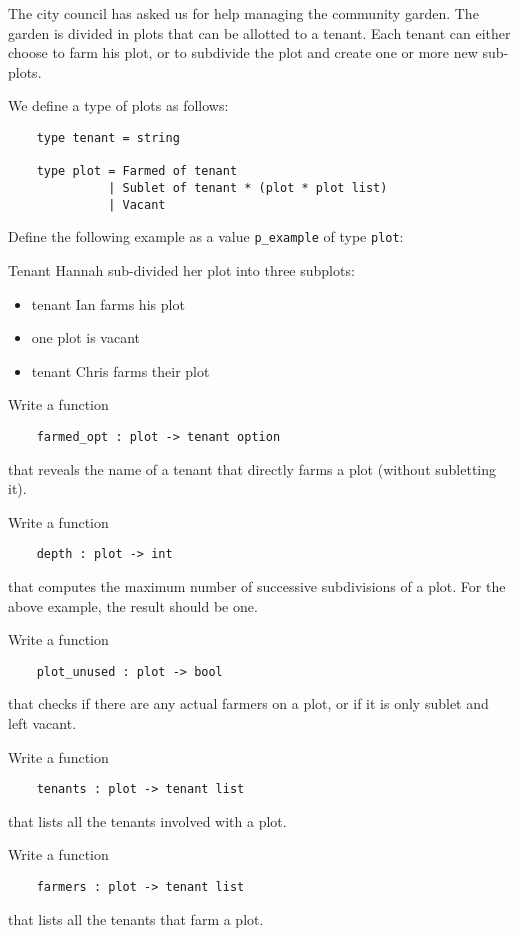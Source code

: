 \documentclass[arhiv]{../izpit}
\begin{document}
\naloga
The city council has asked us for help managing the community garden. The garden is divided in plots that can be allotted to a tenant. Each tenant can either choose to farm his plot, or to subdivide the plot and create one or more new sub-plots.

We define a type of plots as follows:
\begin{verbatim}
    type tenant = string

    type plot = Farmed of tenant
              | Sublet of tenant * (plot * plot list)
              | Vacant
\end{verbatim}

\podnaloga
Define the following example as a value \verb|p_example| of type \verb|plot|:

Tenant Hannah sub-divided her plot into three subplots:
\begin{itemize}[noitemsep]
\item tenant Ian farms his plot
\item one plot is vacant
\item tenant Chris farms their plot
\end{itemize}

\podnaloga
Write a function
\begin{verbatim}
    farmed_opt : plot -> tenant option
\end{verbatim}
that reveals the name of a tenant that directly farms a plot (without subletting it).

\podnaloga
Write a function
\begin{verbatim}
    depth : plot -> int
\end{verbatim}
that computes the maximum number of successive subdivisions of a plot. For the above example, the result should be one.

\podnaloga
Write a function
\begin{verbatim}
    plot_unused : plot -> bool
\end{verbatim}
that checks if there are any actual farmers on a plot, or if it is only sublet and left vacant.

\podnaloga
Write a function
\begin{verbatim}
    tenants : plot -> tenant list
\end{verbatim}
that lists all the tenants involved with a plot.

\podnaloga
Write a function
\begin{verbatim}
    farmers : plot -> tenant list
\end{verbatim}
that lists all the tenants that farm a plot.
\end{document}
